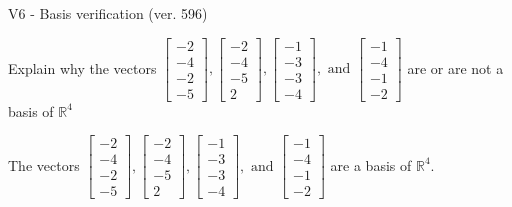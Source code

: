 \begin{exercise}
  \begin{exerciseTitle}V6 - Basis verification (ver. 596)\end{exerciseTitle}
  \begin{exerciseStatement}
    Explain why the vectors \(\left[\begin{array}{r}
-2 \\
-4 \\
-2 \\
-5
\end{array}\right] , \left[\begin{array}{r}
-2 \\
-4 \\
-5 \\
2
\end{array}\right] , \left[\begin{array}{r}
-1 \\
-3 \\
-3 \\
-4
\end{array}\right] , \text{ and } \left[\begin{array}{r}
-1 \\
-4 \\
-1 \\
-2
\end{array}\right]\) are or are not a basis of \(\mathbb{R}^4\)	


  \end{exerciseStatement}
  \begin{exerciseAnswer}
   The vectors \(\left[\begin{array}{r}
-2 \\
-4 \\
-2 \\
-5
\end{array}\right] , \left[\begin{array}{r}
-2 \\
-4 \\
-5 \\
2
\end{array}\right] , \left[\begin{array}{r}
-1 \\
-3 \\
-3 \\
-4
\end{array}\right] , \text{ and } \left[\begin{array}{r}
-1 \\
-4 \\
-1 \\
-2
\end{array}\right]\) 
  	 are  a basis of \(\mathbb{R}^4\).
  


  \end{exerciseAnswer}
\end{exercise}